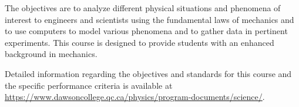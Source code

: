 {The objectives are to analyze different physical situations and phenomena of interest to engineers and scientists using the fundamental laws of mechanics and to use computers to model various phenomena and to gather data in pertinent experiments.  This course is designed to provide students with an enhanced background in mechanics.
\smallskip

Detailed information regarding the objectives and standards for this course and the specific performance criteria is available at \url{https://www.dawsoncollege.qc.ca/physics/program-documents/science/}.}
